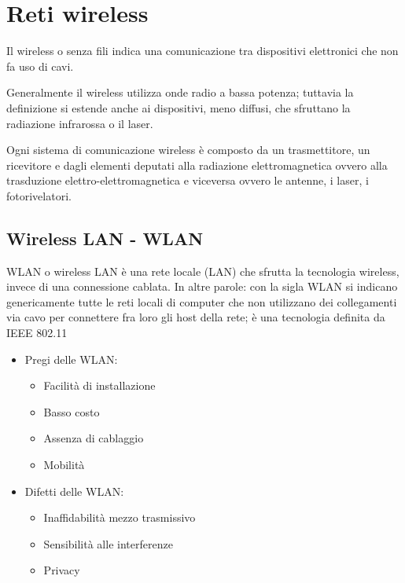 
\newpage

\section{Reti wireless}
Il wireless o senza fili indica una comunicazione tra dispositivi elettronici che non fa uso di cavi.

Generalmente il wireless utilizza onde radio a bassa potenza; tuttavia la definizione si estende anche ai dispositivi, meno diffusi, che sfruttano la radiazione infrarossa o il laser.

Ogni sistema di comunicazione wireless è composto da un trasmettitore, un ricevitore e dagli elementi deputati alla radiazione elettromagnetica ovvero alla trasduzione elettro-elettromagnetica e viceversa ovvero le antenne, i laser, i fotorivelatori.


\subsection{Wireless LAN - WLAN}
WLAN o wireless LAN è una rete locale (LAN) che sfrutta la tecnologia wireless, invece di una connessione cablata. In altre parole: con la sigla WLAN si indicano genericamente tutte le reti locali di computer che non utilizzano dei collegamenti via cavo per connettere fra loro gli host della rete; è una tecnologia definita da IEEE 802.11


\begin{multicols}{2}
    \begin{itemize}
        \item Pregi delle WLAN:
        \begin{itemize}
            \item Facilità di installazione
            \item Basso costo
            \item Assenza di cablaggio
            \item Mobilità
        \end{itemize}
    \end{itemize}
    \columnbreak
    \begin{itemize}
        \item Difetti delle WLAN:
        \begin{itemize}
            \item Inaffidabilità mezzo trasmissivo
            \item Sensibilità alle interferenze
            \item Privacy
        \end{itemize}
    \end{itemize}
\end{multicols}

